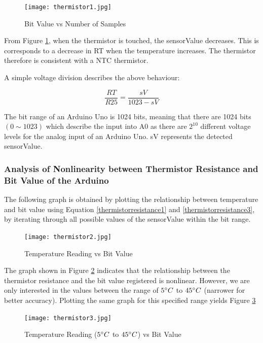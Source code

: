 \begin{figure}[H]
	\centering
	\texttt{[image: thermistor1.jpg]}
	\caption{Bit Value vs Number of Samples}
	\label{bitvaluevssamples}
\end{figure}

From Figure \ref{bitvaluevssamples}, when the thermistor is touched, the sensorValue decreases. This is corresponds to a decrease in RT when the temperature increases. The thermistor therefore is consistent with a NTC thermistor. 

A simple voltage division describes the above behaviour: 

\begin{equation}
	\frac{RT}{R25}=\frac{sV}{1023-sV}
	\label{thermistorresistance3}
\end{equation}

The bit range of an Arduino Uno is 1024 bits, meaning that there are 1024 bits $(0\sim 1023)$ which describe the input into A0 as there are $2^{10}$ different voltage levels for the analog input of an Arduino Uno. sV represents the detected sensorValue. 


\subsubsection{Analysis of Nonlinearity between Thermistor Resistance and Bit Value of the Arduino}

The following graph is obtained by plotting the relationship between temperature and bit value using Equation \ref{thermistorresistance1} and \ref{thermistorresistance3}, by iterating through all possible values of the sensorValue within the bit range.

\begin{figure}[H]
	\centering
	\texttt{[image: thermistor2.jpg]}
	\caption{Temperature Reading vs Bit Value}
	\label{temperaturevsbitvalue}
\end{figure}

The graph shown in Figure \ref{temperaturevsbitvalue} indicates that the relationship between the thermistor resistance and the bit value registered is nonlinear. However, we are only interested in the values between the range of $5\degree C$ to $45\degree C$ (narrower for better accuracy). Plotting the same graph for this specified range yields Figure \ref{temperaturevsbitvalue5-45} 

\begin{figure}[H]
	\centering
	\texttt{[image: thermistor3.jpg]}
	\caption{Temperature Reading ($5\degree C$ to $45\degree C$) vs Bit Value}
	\label{temperaturevsbitvalue5-45}
\end{figure}

